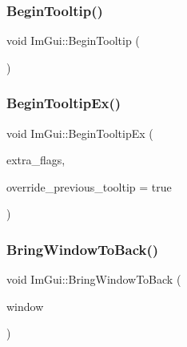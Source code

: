 \hypertarget{namespace_im_gui_a36816a48385f4759d746a03cf6202512}{}\label{namespace_im_gui_a36816a48385f4759d746a03cf6202512} 
\subsubsection{\texorpdfstring{Begin\+Tooltip()}{BeginTooltip()}}
{\footnotesize\ttfamily void Im\+Gui\+::\+Begin\+Tooltip (\begin{DoxyParamCaption}{ }\end{DoxyParamCaption})}

\hypertarget{namespace_im_gui_a3189530b7795a9b99169eb95f36c516d}{}\label{namespace_im_gui_a3189530b7795a9b99169eb95f36c516d} 
\subsubsection{\texorpdfstring{Begin\+Tooltip\+Ex()}{BeginTooltipEx()}}
{\footnotesize\ttfamily void Im\+Gui\+::\+Begin\+Tooltip\+Ex (\begin{DoxyParamCaption}\item[{Im\+Gui\+Window\+Flags}]{extra\+\_\+flags,  }\item[{bool}]{override\+\_\+previous\+\_\+tooltip = {\ttfamily true} }\end{DoxyParamCaption})}

\hypertarget{namespace_im_gui_aa4205bd07b25655ed023f47b52572273}{}\label{namespace_im_gui_aa4205bd07b25655ed023f47b52572273} 
\subsubsection{\texorpdfstring{Bring\+Window\+To\+Back()}{BringWindowToBack()}}
{\footnotesize\ttfamily void Im\+Gui\+::\+Bring\+Window\+To\+Back (\begin{DoxyParamCaption}\item[{\hyperlink{struct_im_gui_window}{Im\+Gui\+Window} $\ast$}]{window }\end{DoxyParamCaption})}

\hypertarget{namespace_im_gui_a5a4f4151114339422bfff1b2fffd022c}{}\label{namespace_im_gui_a5a4f4151114339422bfff1b2fffd022c} 
